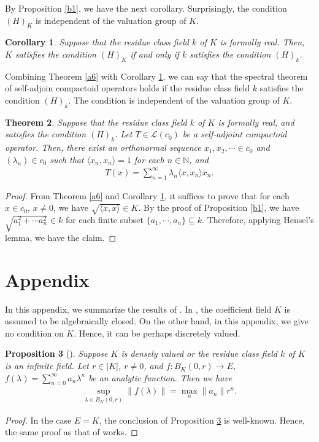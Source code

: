 \documentclass[12pt]{amsart}
\theoremstyle{plain}
\newtheorem{prop} {Proposition} [section]
\newtheorem{thm}[prop] {Theorem}
\newtheorem{cor}[prop]{Corollary}
\theoremstyle{definition}
\begin{document}
By Proposition \ref{b1}, we have the next corollary. Surprisingly, the condition $(H)_K$ is independent of the valuation group of $K$.         

\begin{cor} \label{b3}
  Suppose that the residue class field $k$ of $K$ is formally real. Then, $K$ satisfies the condition $(H)_K$ if and only if $k$ satisfies the condition $(H)_k$.
\end{cor}

Combining Theorem \ref{a6} with Corollary \ref{b3}, we can say that the spectral theorem of self-adjoin compactoid operators holds if the residue class field $k$ satisfies the condition $(H)_k$. The condition is independent of the valuation group of $K$. 

\begin{thm}
  Suppose that the residue class field $k$ of $K$ is formally real, and satisfies the condition $(H)_k$. Let $T \in \mathcal{L}(c_0)$ be a self-adjoint compactoid operator. Then, there exist an orthonormal sequence $x_1, x_2, \cdots \in c_0$ and $(\lambda_n) \in c_0$ such that $\langle x_n, x_n \rangle = 1$ for each $n \in \mathbb{N}$, and
  \begin{align*}
    T(x) = \sum_{n=1}^\infty \lambda_n \langle x, x_n \rangle x_n.
  \end{align*}
\end{thm}
\begin{proof}
  From Theorem \ref{a6} and Corollary \ref{b3}, it suffices to prove that for each $x \in c_0$, $x \neq 0$, we have $\sqrt{\langle x, x \rangle} \in K$. By the proof of Proposition \ref{b1}, we have $\sqrt{a_1^2 + \cdots a_n^2} \in k$ for each finite subset $\{a_1, \cdots, a_n \} \subseteq k$. Therefore, applying Hensel's lemma, we have the claim.
\end{proof}

\section{Appendix} \label{app}

In this appendix, we summarize the results of \cite[Section 6]{comp}. In \cite[Section 6]{comp}, the coefficient field $K$ is assumed to be algebraically closed. On the other hand, in this appendix, we give no condition on $K$. Hence, it can be perhaps discretely valued.

\begin{prop}[{\cite[Proposition 6.2]{comp}}] \label{app1}
  Suppose $K$ is densely valued or the residue class field $k$ of $K$ is an infinite field. Let $r \in |K|$, $r \neq 0$, and $f : B_K(0,r) \to E$,  $f(\lambda) = \sum_{n = 0}^{\infty} a_n \lambda^{n}$ be an analytic function. Then we have
  \begin{align*}
    \sup_{\lambda \in B_K(0,r)} \|f(\lambda)\| = \max_n \|a_n\|r^n.
  \end{align*}
\end{prop}
\begin{proof}
  In the case $E = K$, the conclusion of Proposition \ref{app1} is well-known. Hence, the same proof as that of \cite[Proposition 6.2]{comp} works.
\end{proof}
\end{document}
